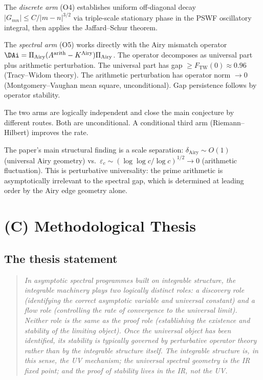 \documentclass[12pt,a4paper]{amsart}
\begin{document}
The \emph{discrete arm} (O4) establishes uniform off-diagonal decay
$|G_{mn}| \le C/|m-n|^{3/2}$ via triple-scale stationary phase
in the PSWF oscillatory integral, then applies the Jaffard--Schur theorem.

The \emph{spectral arm} (O5) works directly with the Airy mismatch
operator $\DAi = \Pi_{\mathrm{Airy}}(A^{\mathrm{arith}} - K^{\mathrm{Airy}})\Pi_{\mathrm{Airy}}$.
The operator decomposes as universal part plus arithmetic perturbation.
The universal part has gap $\ge F_{\mathrm{TW}}(0) \approx 0.96$
(Tracy--Widom theory).
The arithmetic perturbation has operator norm $\to 0$
(Montgomery--Vaughan mean square, unconditional).
Gap persistence follows by operator stability.

The two arms are logically independent and close the main conjecture
by different routes.
Both are unconditional.
A conditional third arm (Riemann--Hilbert) improves the rate.

The paper's main structural finding is a scale separation:
$\delta_{\mathrm{Airy}} \sim O(1)$ (universal Airy geometry)
vs.\ $\varepsilon_c \sim (\log\log c / \log c)^{1/2} \to 0$
(arithmetic fluctuation).
This is perturbative universality: the prime arithmetic is
asymptotically irrelevant to the spectral gap, which is
determined at leading order by the Airy edge geometry alone.

\section*{(C) Methodological Thesis}

\subsection*{The thesis statement}

\begin{quote}
\textit{
In asymptotic spectral programmes built on integrable structure,
the integrable machinery plays two logically distinct roles:
a discovery role (identifying the correct asymptotic variable and
universal constant) and a flow role (controlling the rate of convergence
to the universal limit).
Neither role is the same as the proof role (establishing the
existence and stability of the limiting object).
Once the universal object has been identified,
its stability is typically governed by perturbative operator theory
rather than by the integrable structure itself.
The integrable structure is, in this sense, the UV mechanism;
the universal spectral geometry is the IR fixed point;
and the proof of stability lives in the IR, not the UV.}
\end{quote}
\end{document}
